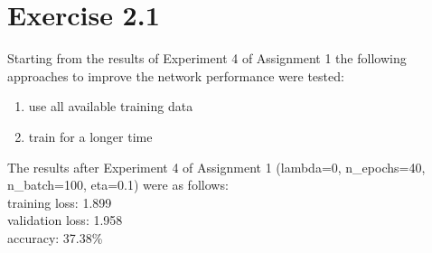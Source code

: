 \section{Exercise 2.1}
Starting from the results of Experiment 4 of Assignment 1 the following approaches to improve the network performance were tested:\\
\begin{enumerate}[label=(\roman*)]
    \item use all available training data
    \item train for a longer time
\end{enumerate}
The results after Experiment 4 of Assignment 1
(lambda=0, n\_epochs=40, n\_batch=100, eta=0.1) were as follows:\\
training loss: 1.899\\
validation loss: 1.958\\
accuracy: 37.38\%\\



\newpage

